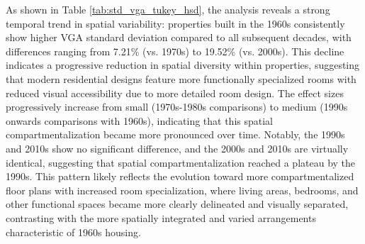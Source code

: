 As shown in Table \ref{tab:std_vga_tukey_hsd}, the analysis reveals a strong temporal trend in spatial variability: properties built in the 1960s 
consistently show higher VGA standard deviation compared to all subsequent decades, with differences 
ranging from 7.21\% (vs. 1970s) to 19.52\% (vs. 2000s). This decline indicates a progressive 
reduction in spatial diversity within properties, suggesting that modern residential designs 
feature more functionally specialized rooms with reduced visual accessibility due to more detailed room design. 
The effect sizes progressively increase from small (1970s-1980s comparisons) to medium 
(1990s onwards comparisons with 1960s), indicating that this spatial compartmentalization became 
more pronounced over time. Notably, the 1990s and 2010s show no significant difference, and the 
2000s and 2010s are virtually identical, suggesting that spatial compartmentalization reached a 
plateau by the 1990s. This pattern likely reflects the evolution toward more compartmentalized 
floor plans with increased room specialization, where living areas, bedrooms, and other functional 
spaces became more clearly delineated and visually separated, contrasting with the more spatially 
integrated and varied arrangements characteristic of 1960s housing.

